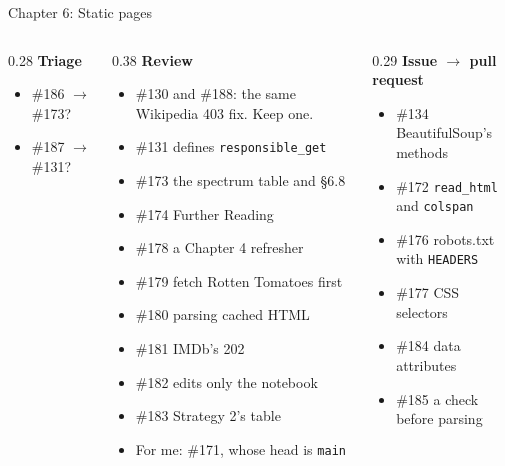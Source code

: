 \documentclass[9pt,aspectratio=169]{beamer}
\begin{document}
\begin{frame}{Chapter 6: Static pages}
    \begin{columns}[T]
        \begin{column}{0.28\textwidth}
            \textbf{Triage}
            \begin{itemize}\small
                \item \#186 $\to$ \#173?
                \item \#187 $\to$ \#131?
            \end{itemize}
        \end{column}
        \begin{column}{0.38\textwidth}
            \textbf{Review}
            \begin{itemize}\small
                \item \#130 and \#188: the same Wikipedia 403 fix. Keep one.
                \item \#131 defines \texttt{responsible\_get}
                \item \#173 the spectrum table and §6.8
                \item \#174 Further Reading
                \item \#178 a Chapter 4 refresher
                \item \#179 fetch Rotten Tomatoes first
                \item \#180 parsing cached HTML
                \item \#181 IMDb's 202
                \item \#182 edits only the notebook
                \item \#183 Strategy 2's table
                \item For me: \#171, whose head is \texttt{main}
            \end{itemize}
        \end{column}
        \begin{column}{0.29\textwidth}
            \textbf{Issue $\to$ pull request}
            \begin{itemize}\small
                \item \#134 BeautifulSoup's methods
                \item \#172 \texttt{read\_html} and \texttt{colspan}
                \item \#176 robots.txt with \texttt{HEADERS}
                \item \#177 CSS selectors
                \item \#184 data attributes
                \item \#185 a check before parsing
            \end{itemize}
        \end{column}
    \end{columns}
\end{frame}
\end{document}
